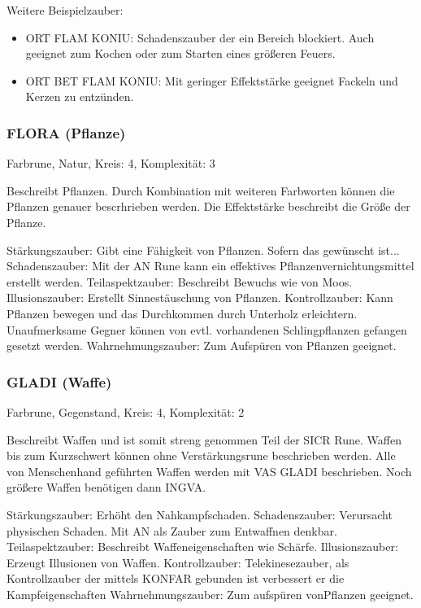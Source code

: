 \documentclass{article}
\begin{document}
Weitere Beispielzauber:

\begin{itemize}
\item ORT FLAM KONIU: Schadenszauber der ein Bereich blockiert. Auch geeignet zum Kochen oder zum Starten eines größeren Feuers.
\item ORT BET FLAM KONIU: Mit geringer Effektstärke geeignet Fackeln und Kerzen zu entzünden.
\end{itemize}

\subsubsection{FLORA (Pflanze)}

Farbrune, Natur, Kreis: 4, Komplexität: 3

Beschreibt Pflanzen. Durch Kombination mit weiteren Farbworten können die Pflanzen genauer bescrhrieben werden. Die
Effektstärke beschreibt die Größe der Pflanze.

Stärkungszauber: Gibt eine Fähigkeit von Pflanzen. Sofern das gewünscht ist...
Schadenszauber: Mit der AN Rune kann ein effektives Pflanzenvernichtungsmittel erstellt werden.
Teilaspektzauber: Beschreibt Bewuchs wie von Moos.
Illusionszauber: Erstellt Sinnestäuschung von Pflanzen.
Kontrollzauber: Kann Pflanzen bewegen und das Durchkommen durch Unterholz erleichtern. Unaufmerksame Gegner können
von evtl. vorhandenen Schlingpflanzen gefangen gesetzt werden.
Wahrnehmungszauber: Zum Aufspüren von Pflanzen geeignet.

\subsubsection{GLADI (Waffe)}

Farbrune, Gegenstand, Kreis: 4, Komplexität: 2

Beschreibt Waffen und ist somit streng genommen Teil der SICR Rune. Waffen bis zum Kurzschwert können ohne
Verstärkungsrune beschrieben werden. Alle von Menschenhand geführten Waffen werden mit VAS GLADI beschrieben. Noch
größere Waffen benötigen dann INGVA.

Stärkungszauber: Erhöht den Nahkampfschaden.
Schadenszauber: Verursacht physischen Schaden. Mit AN als Zauber zum Entwaffnen denkbar.
Teilaspektzauber: Beschreibt Waffeneigenschaften wie Schärfe.
Illusionszauber: Erzeugt Illusionen von Waffen.
Kontrollzauber: Telekinesezauber, als Kontrollzauber der mittels KONFAR gebunden ist verbessert er die Kampfeigenschaften
Wahrnehmungszauber: Zum aufspüren vonPflanzen geeignet.
\end{document}
